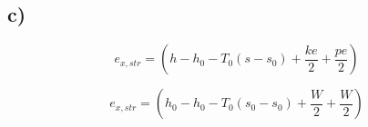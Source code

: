 

\subsection*{c)}

\[
e_{x,str} = \left( h - h_0 - T_0 (s - s_0) + \frac{ke}{2} + \frac{pe}{2} \right)
\]

\[
e_{x,str} = \left( h_0 - h_0 - T_0 (s_0 - s_0) + \frac{W}{2} + \frac{W}{2} \right)
\]